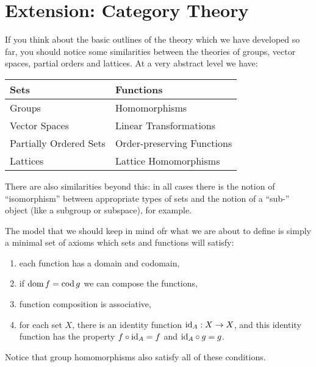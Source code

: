 \section{Extension: Category Theory}

If you think about the basic outlines of the theory which we have developed
so far, you should notice some similarities between the theories of groups,
vector spaces, partial orders and lattices.  At a very abstract level we
have:

\begin{tabular}{l|l}
  Sets & Functions \\
  \hline
  Groups & Homomorphisms \\
  Vector Spaces & Linear Transformations \\
  Partially Ordered Sets & Order-preserving Functions \\
  Lattices & Lattice Homomorphisms
\end{tabular}

There are also similarities beyond this: in all cases there is the notion
of ``isomorphism'' between appropriate types of sets and the notion of a ``sub-''
object (like a subgroup or subspace), for example.

The model that we should keep in mind ofr what we are about to define
is simply a minimal set of axioms which sets and functions will satisfy:
\begin{enumerate}
  \item each function has a domain and codomain,
  
  \item if $\operatorname{dom} f = \operatorname{cod} g$ we can compose the functions,
  
  \item function composition is associative,
  
  \item for each set $X$, there is an identity function $\text{id}_{A}: X
    \to X$, and this identity function has the property  $f \circ 
    \text{id}_{A} = f$ and $\text{id}_{A} \circ g = g$.
\end{enumerate}

Notice that group homomorphisms also satisfy all of these conditions.


